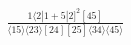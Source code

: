 \documentclass[varwidth, border=5pt]{standalone}
\begin{document}
\begin{my}
$\begin{gathered}
\scriptscriptstyle\frac{1⟨2|1+5|2]^2[45]}{⟨15⟩⟨23⟩[24][25]⟨34⟩⟨45⟩}
\end{gathered}$
\end{my}
\end{document}

